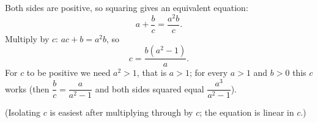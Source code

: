 Both sides are positive, so squaring gives an equivalent equation:
\[
a+\dfrac {b}{c}=\dfrac{a^2b}{c}.
\]
Multiply by $c$: $ac+b=a^2b$, so
\[
c=\boxed{\dfrac{b\left(a^2-1\right)}{a}} .
\]
For $c$ to be positive we need $a^2>1$, that is $a>1$; for every $a>1$ and $b>0$ this $c$ works (then $\dfrac {b}{c}=\dfrac{a}{a^2-1}$ and both sides squared equal $\dfrac{a^3}{a^2-1}$).

(Isolating $c$ is easiest after multiplying through by $c$; the equation is linear in $c$.)
